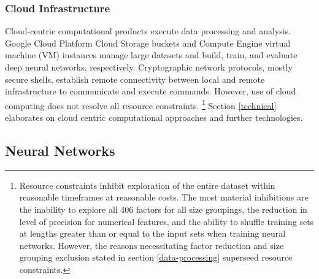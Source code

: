 \documentclass[12pt]{article}
\begin{document}
\subsubsection{Cloud Infrastructure}
Cloud-centric computational products execute data processing and analysis.
Google Cloud Platform Cloud Storage buckets and Compute Engine virtual machine (VM) instances manage large datasets and build, train, and evaluate deep neural networks, respectively.
Cryptographic network protocols, mostly secure shells, establish remote connectivity between local and remote infrastructure to communicate and execute commands.
However, use of cloud computing does not resolve all resource constraints. 
\footnote{Resource constraints inhibit exploration of the entire dataset within reasonable timeframes at reasonable costs.
The most material inhibitions are the inability to explore all 406 factors for all size groupings, the reduction in level of precision for numerical features, and
the ability to shuffle training sets at lengths greater than or equal to the input sets when training neural networks.
However, the reasons necessitating factor reduction and size grouping exclusion stated in section \ref{data-processing} superseed resource constraints.}
Section \ref{technical} elaborates on cloud centric computational approaches and further technologies.

\subsection{Neural Networks}
\end{document}
